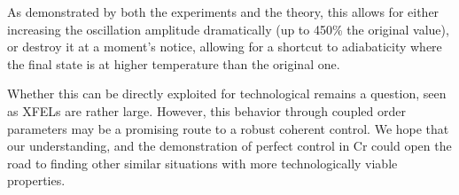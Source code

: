 As demonstrated by both the experiments and the theory, this allows for either increasing the oscillation amplitude dramatically (up to 450\% the original value), or destroy it at a moment's notice, allowing for a shortcut to adiabaticity where the final state is at higher temperature than the original one.

Whether this can be directly exploited for technological remains a question, seen as XFELs are rather large.
However, this behavior through coupled order parameters may be a promising route to a robust coherent control.
We hope that our understanding, and the demonstration of perfect control in Cr could open the road to finding other similar situations with more technologically viable properties.   
